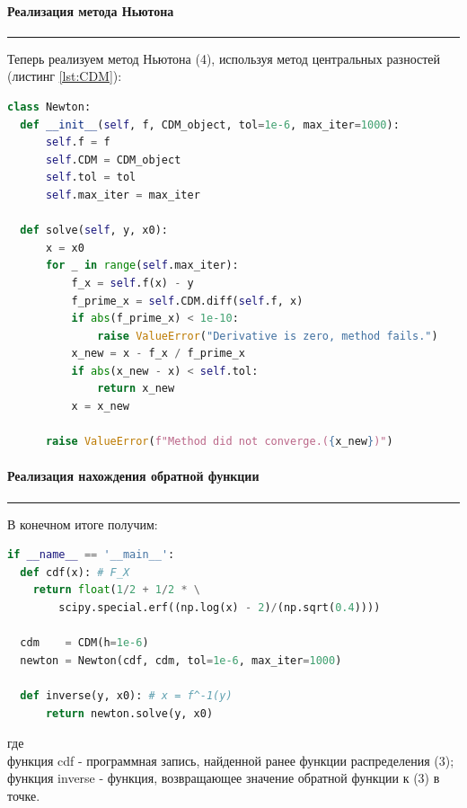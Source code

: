 \documentclass[a4paper, 14pt]{extarticle}
\begin{document}
\paragraph{Реализация метода Ньютона}\vspace{-20pt}\rule{\linewidth}{0.1mm}

Теперь реализуем метод Ньютона (4), используя метод центральных разностей 
(листинг \ref{lst:CDM}):

\begin{center}
  \begin{lstlisting}[language=Python, 
  caption={Реализация метода Ньютона}, 
  label={lst:Newton}]
class Newton:
  def __init__(self, f, CDM_object, tol=1e-6, max_iter=1000):
      self.f = f
      self.CDM = CDM_object
      self.tol = tol 
      self.max_iter = max_iter

  def solve(self, y, x0):
      x = x0
      for _ in range(self.max_iter):
          f_x = self.f(x) - y
          f_prime_x = self.CDM.diff(self.f, x)
          if abs(f_prime_x) < 1e-10:
              raise ValueError("Derivative is zero, method fails.")
          x_new = x - f_x / f_prime_x
          if abs(x_new - x) < self.tol:
              return x_new
          x = x_new

      raise ValueError(f"Method did not converge.({x_new})")
  \end{lstlisting}
\end{center}

\paragraph{Реализация нахождения обратной функции}\vspace{-20pt}\rule{\linewidth}{0.1mm}

В конечном итоге получим:

\begin{center}
  \begin{lstlisting}[language=Python, 
                   caption={Реализация нахождения обратной функции}, 
                   label={lst:inverse}]
if __name__ == '__main__':
  def cdf(x): # F_X
    return float(1/2 + 1/2 * \
        scipy.special.erf((np.log(x) - 2)/(np.sqrt(0.4))))

  cdm    = CDM(h=1e-6)
  newton = Newton(cdf, cdm, tol=1e-6, max_iter=1000)

  def inverse(y, x0): # x = f^-1(y)
      return newton.solve(y, x0)
  \end{lstlisting}
\end{center}
\vspace{10pt}
где\\ 
функция cdf - программная запись, найденной ранее функции распределения (3);\\
функция inverse - функция, возвращающее значение обратной функции к (3) в точке.\\
\end{document}
